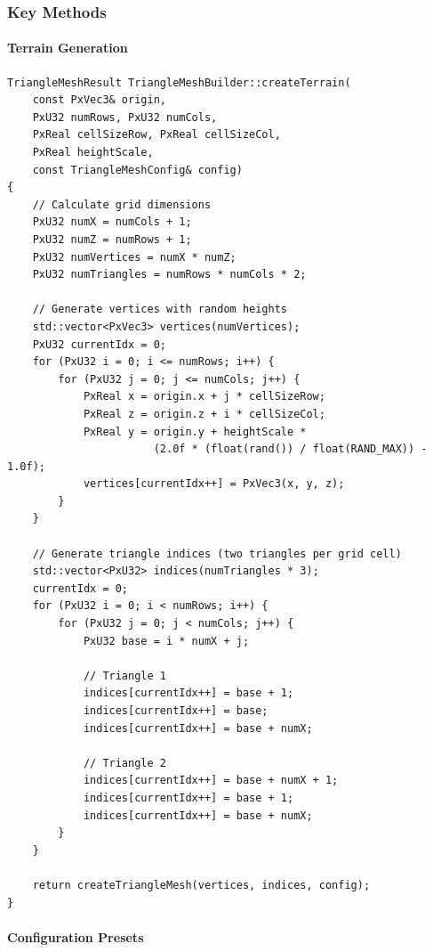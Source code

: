 \subsubsection{Key Methods}

\paragraph{Terrain Generation}

\begin{lstlisting}[caption={Terrain generation method}]
TriangleMeshResult TriangleMeshBuilder::createTerrain(
    const PxVec3& origin,
    PxU32 numRows, PxU32 numCols,
    PxReal cellSizeRow, PxReal cellSizeCol,
    PxReal heightScale,
    const TriangleMeshConfig& config)
{
    // Calculate grid dimensions
    PxU32 numX = numCols + 1;
    PxU32 numZ = numRows + 1;
    PxU32 numVertices = numX * numZ;
    PxU32 numTriangles = numRows * numCols * 2;

    // Generate vertices with random heights
    std::vector<PxVec3> vertices(numVertices);
    PxU32 currentIdx = 0;
    for (PxU32 i = 0; i <= numRows; i++) {
        for (PxU32 j = 0; j <= numCols; j++) {
            PxReal x = origin.x + j * cellSizeRow;
            PxReal z = origin.z + i * cellSizeCol;
            PxReal y = origin.y + heightScale *
                       (2.0f * (float(rand()) / float(RAND_MAX)) - 1.0f);
            vertices[currentIdx++] = PxVec3(x, y, z);
        }
    }

    // Generate triangle indices (two triangles per grid cell)
    std::vector<PxU32> indices(numTriangles * 3);
    currentIdx = 0;
    for (PxU32 i = 0; i < numRows; i++) {
        for (PxU32 j = 0; j < numCols; j++) {
            PxU32 base = i * numX + j;

            // Triangle 1
            indices[currentIdx++] = base + 1;
            indices[currentIdx++] = base;
            indices[currentIdx++] = base + numX;

            // Triangle 2
            indices[currentIdx++] = base + numX + 1;
            indices[currentIdx++] = base + 1;
            indices[currentIdx++] = base + numX;
        }
    }

    return createTriangleMesh(vertices, indices, config);
}
\end{lstlisting}

\paragraph{Configuration Presets}

